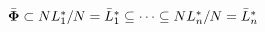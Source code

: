 $\bar {\bf \Phi} \subset NL_1^*/N=\bar L_1^* \subseteq \cdots \subseteq N L_n^*/N = \bar L_n^*$

\bye


